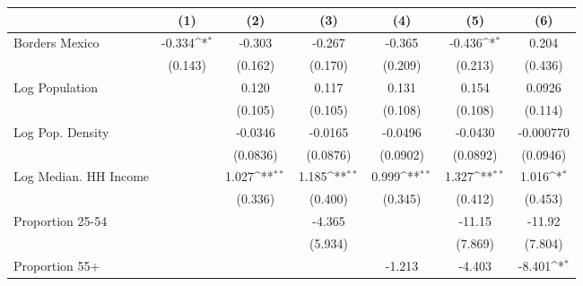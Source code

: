{
\def\sym#1{\ifmmode^{#1}\else\(^{#1}\)\fi}
\begin{tabular}{l*{6}{c}}
\toprule
                    &\multicolumn{1}{c}{(1)}         &\multicolumn{1}{c}{(2)}         &\multicolumn{1}{c}{(3)}         &\multicolumn{1}{c}{(4)}         &\multicolumn{1}{c}{(5)}         &\multicolumn{1}{c}{(6)}         \\
\midrule
Borders Mexico      &      -0.334\sym{*}  &      -0.303         &      -0.267         &      -0.365         &      -0.436\sym{*}  &       0.204         \\
                    &     (0.143)         &     (0.162)         &     (0.170)         &     (0.209)         &     (0.213)         &     (0.436)         \\
\addlinespace
Log Population      &                     &       0.120         &       0.117         &       0.131         &       0.154         &      0.0926         \\
                    &                     &     (0.105)         &     (0.105)         &     (0.108)         &     (0.108)         &     (0.114)         \\
\addlinespace
Log Pop. Density    &                     &     -0.0346         &     -0.0165         &     -0.0496         &     -0.0430         &   -0.000770         \\
                    &                     &    (0.0836)         &    (0.0876)         &    (0.0902)         &    (0.0892)         &    (0.0946)         \\
\addlinespace
Log Median. HH Income&                     &       1.027\sym{**} &       1.185\sym{**} &       0.999\sym{**} &       1.327\sym{**} &       1.016\sym{*}  \\
                    &                     &     (0.336)         &     (0.400)         &     (0.345)         &     (0.412)         &     (0.453)         \\
\addlinespace
Proportion 25-54    &                     &                     &      -4.365         &                     &      -11.15         &      -11.92         \\
                    &                     &                     &     (5.934)         &                     &     (7.869)         &     (7.804)         \\
\addlinespace
Proportion 55+      &                     &                     &                     &      -1.213         &      -4.403         &      -8.401\sym{*}  \\

\end{tabular}}
